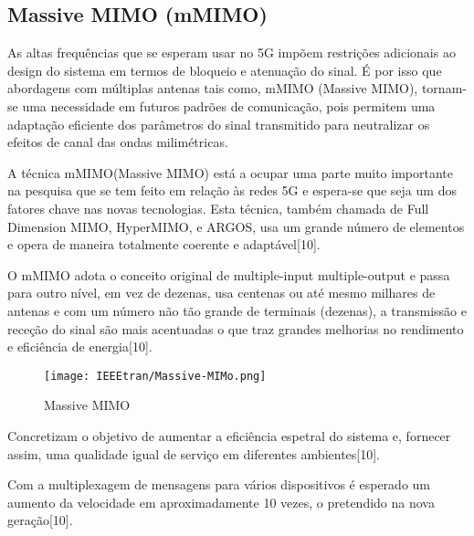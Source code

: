 \documentclass[conference]{IEEEtran}
\begin{document}
\subsection{Massive MIMO (mMIMO)}
As altas frequências que se esperam usar no 5G impõem restrições adicionais ao design do sistema em termos de bloqueio e atenuação do sinal. É por isso que abordagens com múltiplas antenas tais como, mMIMO (Massive MIMO), tornam-se uma necessidade em futuros padrões de comunicação, pois permitem uma adaptação eficiente dos parâmetros do sinal transmitido para neutralizar os efeitos de canal das ondas milimétricas.\par
A técnica mMIMO(Massive MIMO) está a ocupar uma parte muito importante na pesquisa que se tem feito em relação às redes 5G e espera-se que seja um dos fatores chave nas novas tecnologias. Esta técnica, também chamada de Full Dimension MIMO, HyperMIMO, e ARGOS, usa um grande número de elementos e opera de maneira totalmente coerente e adaptável[10]. \par
O mMIMO adota o conceito original de multiple-input multiple-output e passa para outro nível, em vez de dezenas, usa centenas ou até mesmo milhares de antenas e com um número não tão grande de terminais (dezenas), a transmissão e receção do sinal são mais acentuadas o que traz grandes melhorias no rendimento e eficiência de energia[10]. 
\begin{figure}[ht]
    \centering
    \texttt{[image: IEEEtran/Massive-MIMo.png]}
    \caption{Massive MIMO}
\end{figure}
Concretizam o objetivo de aumentar a eficiência espetral do sistema e, fornecer assim, uma qualidade igual de serviço em diferentes ambientes[10].\par
Com a multiplexagem de mensagens para vários dispositivos é esperado um aumento da velocidade em aproximadamente 10 vezes, o pretendido na nova geração[10].
\end{document}
